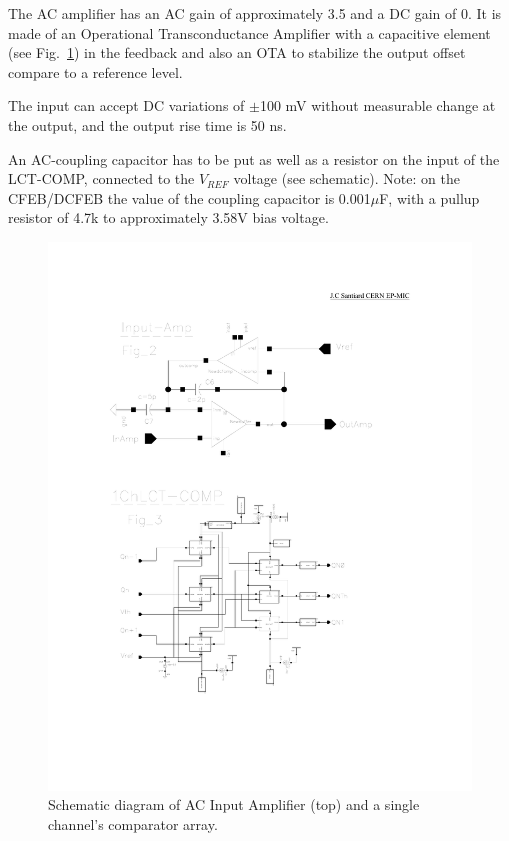 \documentclass[letterpaper]{article}
\begin{document}
The AC amplifier has an AC gain of approximately 3.5 and a DC gain of 0. It is made of an Operational Transconductance Amplifier with a capacitive element (see Fig.~\ref{fig:ac-amplifier}) in the feedback and also an OTA to stabilize the output offset compare to a reference level.

The input can accept DC variations of $\pm$100 mV without measurable change at the output, and the output rise time is 50 ns.

An AC-coupling capacitor has to be put as well as a resistor on the input of the LCT-COMP, connected to the $V_{REF}$ voltage (see schematic). Note: on the CFEB/DCFEB the value of the coupling capacitor is 0.001$\mu$F, with a pullup resistor of 4.7k to approximately 3.58V bias voltage.

\begin{figure}[H]
\label{fig:ac-amplifier}
\centering
\includegraphics[keepaspectratio=true, width=1.0 \textwidth]{Images/ac-amplifier_and_comparator.pdf}
\caption{Schematic diagram of AC Input Amplifier (top) and a single channel's comparator array.}
\end{figure}
\end{document}
